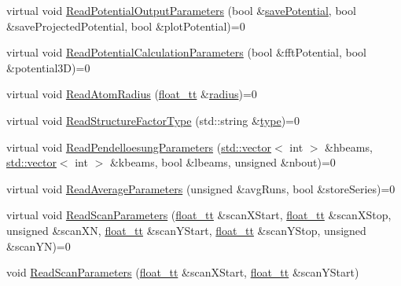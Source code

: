 \begin{DoxyCompactItemize}
\item 
virtual void \hyperlink{class_q_s_t_e_m_1_1_i_config_reader_af73b298ec0ecb42d4941fa018afe5913}{Read\-Potential\-Output\-Parameters} (bool \&\hyperlink{qstem_8m_a2627b1fe484f7e86e38deba8dabb27ed}{save\-Potential}, bool \&save\-Projected\-Potential, bool \&plot\-Potential)=0
\item 
virtual void \hyperlink{class_q_s_t_e_m_1_1_i_config_reader_aa7740a3cee3ae2e2df50b2162e93567f}{Read\-Potential\-Calculation\-Parameters} (bool \&fft\-Potential, bool \&potential3\-D)=0
\item 
virtual void \hyperlink{class_q_s_t_e_m_1_1_i_config_reader_a07733a8fe05551a8cbd9cc08beb8cea1}{Read\-Atom\-Radius} (\hyperlink{namespace_q_s_t_e_m_a915d7caa497280d9f927c4ce8d330e47}{float\-\_\-tt} \&\hyperlink{_displacement_params_8m_acc620a89e606f875661525fd6365a421}{radius})=0
\item 
virtual void \hyperlink{class_q_s_t_e_m_1_1_i_config_reader_a18729ce6b5998ce15d4d1f5cce0f5fc0}{Read\-Structure\-Factor\-Type} (std\-::string \&\hyperlink{convert2cfg_8m_a2902a7a983ab04c79cae2162ad553481}{type})=0
\item 
virtual void \hyperlink{class_q_s_t_e_m_1_1_i_config_reader_a308c5177acd0ae6e9019817ad52a8f0e}{Read\-Pendelloesung\-Parameters} (\hyperlink{qmb_8m_af54b69a32590de218622e869b06b47b3}{std\-::vector}$<$ int $>$ \&hbeams, \hyperlink{qmb_8m_af54b69a32590de218622e869b06b47b3}{std\-::vector}$<$ int $>$ \&kbeams, bool \&lbeams, unsigned \&nbout)=0
\item 
virtual void \hyperlink{class_q_s_t_e_m_1_1_i_config_reader_aba41ea1e00e4f39a849ae495fceddeed}{Read\-Average\-Parameters} (unsigned \&avg\-Runs, bool \&store\-Series)=0
\item 
virtual void \hyperlink{class_q_s_t_e_m_1_1_i_config_reader_ab6ea24d0f2d47f1dce8a82e2668e2e75}{Read\-Scan\-Parameters} (\hyperlink{namespace_q_s_t_e_m_a915d7caa497280d9f927c4ce8d330e47}{float\-\_\-tt} \&scan\-X\-Start, \hyperlink{namespace_q_s_t_e_m_a915d7caa497280d9f927c4ce8d330e47}{float\-\_\-tt} \&scan\-X\-Stop, unsigned \&scan\-X\-N, \hyperlink{namespace_q_s_t_e_m_a915d7caa497280d9f927c4ce8d330e47}{float\-\_\-tt} \&scan\-Y\-Start, \hyperlink{namespace_q_s_t_e_m_a915d7caa497280d9f927c4ce8d330e47}{float\-\_\-tt} \&scan\-Y\-Stop, unsigned \&scan\-Y\-N)=0
\item 
void \hyperlink{class_q_s_t_e_m_1_1_i_config_reader_af41ef0a0410b8b1b49476c2167a763cf}{Read\-Scan\-Parameters} (\hyperlink{namespace_q_s_t_e_m_a915d7caa497280d9f927c4ce8d330e47}{float\-\_\-tt} \&scan\-X\-Start, \hyperlink{namespace_q_s_t_e_m_a915d7caa497280d9f927c4ce8d330e47}{float\-\_\-tt} \&scan\-Y\-Start)

\end{DoxyCompactItemize}
